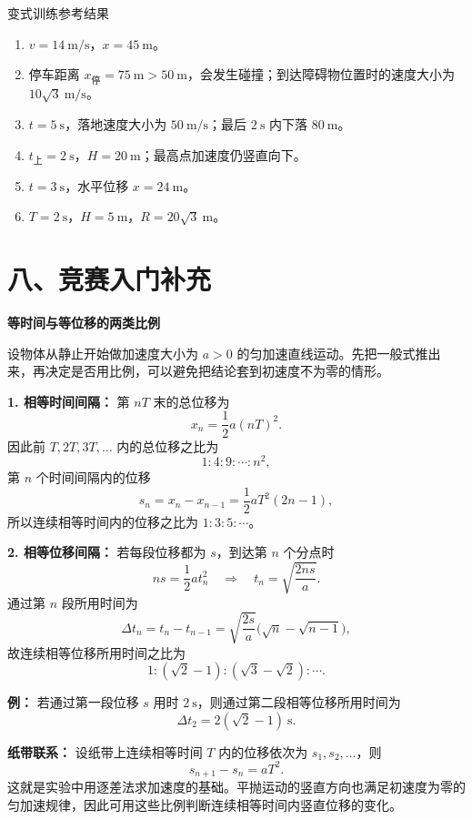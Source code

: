 \begin{samepage}
\begin{learningbox}{变式训练参考结果}
\begin{enumerate}
  \item $v=14\ \mathrm{m/s}$，$x=45\ \mathrm{m}$。
  \item 停车距离 $x_{\text{停}}=75\ \mathrm{m}>50\ \mathrm{m}$，会发生碰撞；到达障碍物位置时的速度大小为 $10\sqrt3\ \mathrm{m/s}$。
  \item $t=5\ \mathrm{s}$，落地速度大小为 $50\ \mathrm{m/s}$；最后 $2\ \mathrm{s}$ 内下落 $80\ \mathrm{m}$。
  \item $t_{\text{上}}=2\ \mathrm{s}$，$H=20\ \mathrm{m}$；最高点加速度仍竖直向下。
  \item $t=3\ \mathrm{s}$，水平位移 $x=24\ \mathrm{m}$。
  \item $T=2\ \mathrm{s}$，$H=5\ \mathrm{m}$，$R=20\sqrt3\ \mathrm{m}$。
\end{enumerate}
\end{learningbox}
\end{samepage}
\endgroup

\section*{八、竞赛入门补充}

\nopagebreak
\begin{competitionbox}
\textbf{等时间与等位移的两类比例}

设物体从静止开始做加速度大小为 $a>0$ 的匀加速直线运动。先把一般式推出来，再决定是否用比例，可以避免把结论套到初速度不为零的情形。

\textbf{1. 相等时间间隔：} 第 $nT$ 末的总位移为
\[
x_n=\frac12a(nT)^2.
\]
因此前 $T,2T,3T,\ldots$ 内的总位移之比为
\[
1:4:9:\cdots:n^2,
\]
第 $n$ 个时间间隔内的位移
\[
s_n=x_n-x_{n-1}
   =\frac12aT^2(2n-1),
\]
所以连续相等时间内的位移之比为 $1:3:5:\cdots$。

\textbf{2. 相等位移间隔：} 若每段位移都为 $s$，到达第 $n$ 个分点时
\[
ns=\frac12at_n^2
\quad\Longrightarrow\quad
t_n=\sqrt{\frac{2ns}{a}}.
\]
通过第 $n$ 段所用时间为
\[
\Delta t_n=t_n-t_{n-1}
=\sqrt{\frac{2s}{a}}\bigl(\sqrt n-\sqrt{n-1}\bigr),
\]
故连续相等位移所用时间之比为
\[
1:(\sqrt2-1):(\sqrt3-\sqrt2):\cdots .
\]

\textbf{例：} 若通过第一段位移 $s$ 用时 $2\ \mathrm{s}$，则通过第二段相等位移所用时间为
\[
\Delta t_2=2(\sqrt2-1)\ \mathrm{s}.
\]

\textbf{纸带联系：} 设纸带上连续相等时间 $T$ 内的位移依次为 $s_1,s_2,\ldots$，则
\[
s_{n+1}-s_n=aT^2.
\]
这就是实验中用逐差法求加速度的基础。平抛运动的竖直方向也满足初速度为零的匀加速规律，因此可用这些比例判断连续相等时间内竖直位移的变化。
\end{competitionbox}

